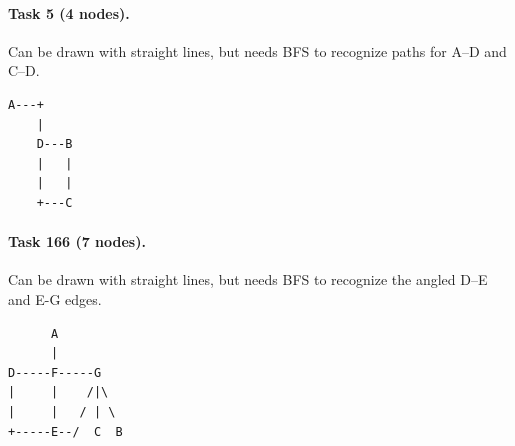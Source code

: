 \documentclass{article}
\begin{document}
\paragraph{Task 5 (4 nodes).} Can be drawn with straight lines, but needs BFS to recognize paths for A--D and C--D.

\begin{verbatim}
A---+
    |
    D---B
    |   |
    |   |
    +---C
\end{verbatim}

\paragraph{Task 166 (7 nodes).} Can be drawn with straight lines, but needs BFS to recognize the angled D--E and E-G edges.

\begin{verbatim}
      A
      |
D-----F-----G
|     |    /|\
|     |   / | \
+-----E--/  C  B
\end{verbatim}
\end{document}
